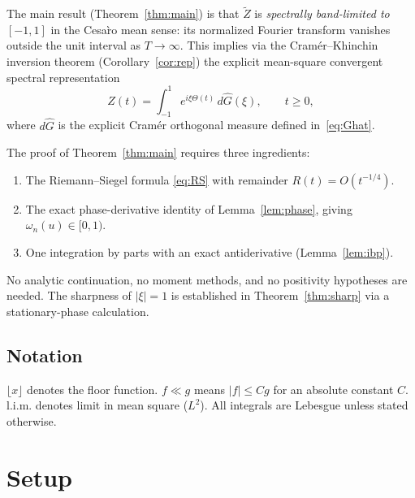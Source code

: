 \documentclass[12pt]{amsart}
\theoremstyle{definition}
\theoremstyle{remark}
\newcommand{\Zt}{\widetilde{Z}}
\newcommand{\lm}{\mathrm{l.i.m.}}
\begin{document}
The main result (Theorem~\ref{thm:main}) is that $\Zt$ is
\emph{spectrally band-limited to $[-1,1]$} in the Cesa\`{r}o mean
sense: its normalized Fourier transform vanishes outside the unit
interval as $T\to\infty$.  This implies via the Cram\'{e}r--Khinchin
inversion theorem (Corollary~\ref{cor:rep}) the explicit mean-square
convergent spectral representation
\[
  Z(t) = \int_{-1}^{1} e^{i\xi\Theta(t)}\,d\hat G(\xi), \qquad t\ge 0,
\]
where $d\hat G$ is the explicit Cram\'{e}r orthogonal measure defined
in~\eqref{eq:Ghat}.

The proof of Theorem~\ref{thm:main} requires three ingredients:
\begin{enumerate}
\item The Riemann--Siegel formula \eqref{eq:RS} with remainder $R(t)=O(t^{-1/4})$.
\item The exact phase-derivative identity of Lemma~\ref{lem:phase},
      giving $\omega_n(u)\in[0,1)$.
\item One integration by parts with an exact antiderivative
      (Lemma~\ref{lem:ibp}).
\end{enumerate}
No analytic continuation, no moment methods, and no positivity hypotheses
are needed.  The sharpness of $|\xi|=1$ is established in
Theorem~\ref{thm:sharp} via a stationary-phase calculation.

\subsection*{Notation}
$\lfloor x\rfloor$ denotes the floor function.  $f\ll g$ means
$|f|\le Cg$ for an absolute constant $C$.  $\lm$ denotes limit in mean
square ($L^2$). All integrals are Lebesgue unless stated otherwise.

\section{Setup}\label{sec:setup}
\end{document}
